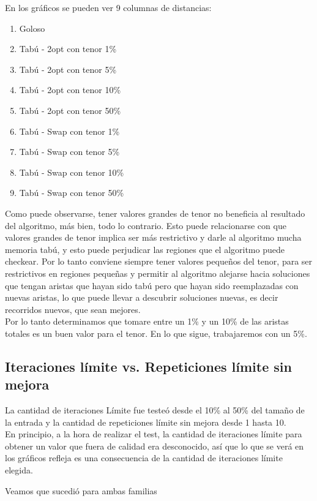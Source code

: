 En los gráficos se pueden ver 9 columnas de distancias:

\begin{enumerate}
\item Goloso
\item Tabú - 2opt con tenor 1\%
\item Tabú - 2opt con tenor 5\%
\item Tabú - 2opt con tenor 10\%
\item Tabú - 2opt con tenor 50\%
\item Tabú - Swap con tenor 1\%
\item Tabú - Swap con tenor 5\%
\item Tabú - Swap con tenor 10\%
\item Tabú - Swap con tenor 50\%
\end{enumerate}

Como puede observarse, tener valores grandes de tenor no beneficia al resultado del algoritmo, más bien, todo lo contrario. Esto puede relacionarse con que valores grandes de tenor implica ser más restrictivo y darle al algoritmo mucha memoria tabú, y esto puede perjudicar las regiones que el algoritmo puede checkear. Por lo tanto conviene siempre tener valores pequeños del tenor, para ser restrictivos en regiones pequeñas y permitir al algoritmo alejarse hacia soluciones que tengan aristas que hayan sido tabú pero que hayan sido reemplazadas con nuevas aristas, lo que puede llevar a descubrir soluciones nuevas, es decir recorridos nuevos, que sean mejores.\\

Por lo tanto determinamos que tomare entre un 1\% y un 10\% de las aristas totales es un buen valor para el tenor. En lo que sigue, trabajaremos con un 5\%.

\subsection*{Iteraciones límite vs. Repeticiones límite sin mejora}

La cantidad de iteraciones Límite fue testeó desde el 10\% al 50\% del tamaño de la entrada y la cantidad de repeticiones límite sin mejora desde 1 hasta 10.\\
En principio, a la hora de realizar el test, la cantidad de iteraciones límite para obtener un valor que fuera de calidad era desconocido, así que lo que se verá en los gráficos refleja es una consecuencia de la cantidad de iteraciones límite elegida.

Veamos que sucedió para ambas familias

